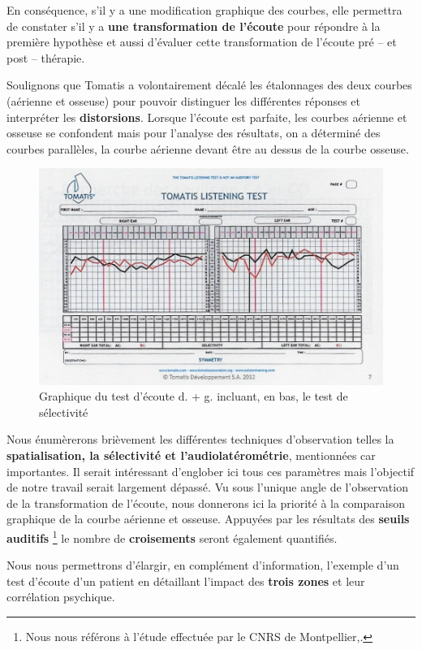  En  conséquence,  s'il y a une modification
          graphique des courbes, elle
          permettra de constater s'il y a \textbf{une transformation de l'écoute}
          pour répondre à la première hypothèse et aussi d'évaluer cette transformation de l'écoute pré -- et
          post -- thérapie.




Soulignons que Tomatis a volontairement décalé les étalonnages des deux courbes (aérienne
	et osseuse) pour pouvoir distinguer les différentes réponses et interpréter
	les \textbf{distorsions}. Lorsque l'écoute est parfaite, les
	courbes aérienne et osseuse se confondent mais pour l'analyse des
	résultats, on a déterminé des courbes parallèles, la courbe aérienne
	devant être au dessus de la courbe osseuse.


\begin{figure}
	\centering
	\includegraphics[width=0.7\linewidth]{images/tomatisListeningTest.jpg}
	\caption[Graphique du test d'écoute]{Graphique du test
          d'écoute d. + g. incluant, en bas, le test de sélectivité}
	\label{fig:tomatislisteningtest}
\end{figure}



Nous énumèrerons brièvement les
différentes techniques d'observation telles la
\textbf{spatialisation, la
sélectivité et l'audiolatérométrie}, mentionnées car importantes.
 Il serait intéressant d'englober ici tous ces paramètres mais
  l'objectif de notre travail serait largement dépassé.
Vu sous l'unique angle de l'observation de la transformation de l'écoute, nous
donnerons ici la priorité à la comparaison graphique
de la courbe aérienne et osseuse. Appuyées par les résultats
des \textbf{seuils auditifs}
\footnote{Nous nous référons à
  l'étude effectuée par le CNRS de Montpellier,\autocite{affectiveDisorders}.}
le nombre de \textbf{croisements }seront
également quantifiés.

Nous nous permettrons d'élargir, en
complément d'information, l'exemple d'un test d'écoute d'un patient en détaillant l'impact
des\textbf{ trois zones} et leur corrélation psychique.



